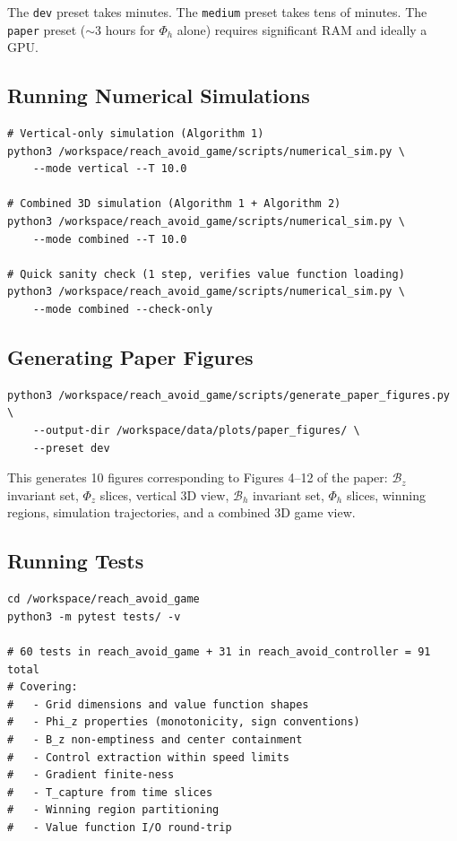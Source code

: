 \documentclass[11pt,a4paper]{article}
\begin{document}
\begin{infobox}
The \texttt{dev} preset takes minutes. The \texttt{medium} preset takes tens of minutes. The \texttt{paper} preset ($\sim$3 hours for $\Phi_h$ alone) requires significant RAM and ideally a GPU.
\end{infobox}

\subsection{Running Numerical Simulations}

\begin{lstlisting}[style=bashstyle]
# Vertical-only simulation (Algorithm 1)
python3 /workspace/reach_avoid_game/scripts/numerical_sim.py \
    --mode vertical --T 10.0

# Combined 3D simulation (Algorithm 1 + Algorithm 2)
python3 /workspace/reach_avoid_game/scripts/numerical_sim.py \
    --mode combined --T 10.0

# Quick sanity check (1 step, verifies value function loading)
python3 /workspace/reach_avoid_game/scripts/numerical_sim.py \
    --mode combined --check-only
\end{lstlisting}

\subsection{Generating Paper Figures}

\begin{lstlisting}[style=bashstyle]
python3 /workspace/reach_avoid_game/scripts/generate_paper_figures.py \
    --output-dir /workspace/data/plots/paper_figures/ \
    --preset dev
\end{lstlisting}

This generates 10 figures corresponding to Figures 4--12 of the paper: $\mathcal{B}_z$ invariant set, $\Phi_z$ slices, vertical 3D view, $\mathcal{B}_h$ invariant set, $\Phi_h$ slices, winning regions, simulation trajectories, and a combined 3D game view.

\subsection{Running Tests}

\begin{lstlisting}[style=bashstyle]
cd /workspace/reach_avoid_game
python3 -m pytest tests/ -v

# 60 tests in reach_avoid_game + 31 in reach_avoid_controller = 91 total
# Covering:
#   - Grid dimensions and value function shapes
#   - Phi_z properties (monotonicity, sign conventions)
#   - B_z non-emptiness and center containment
#   - Control extraction within speed limits
#   - Gradient finite-ness
#   - T_capture from time slices
#   - Winning region partitioning
#   - Value function I/O round-trip
\end{lstlisting}
\end{document}
